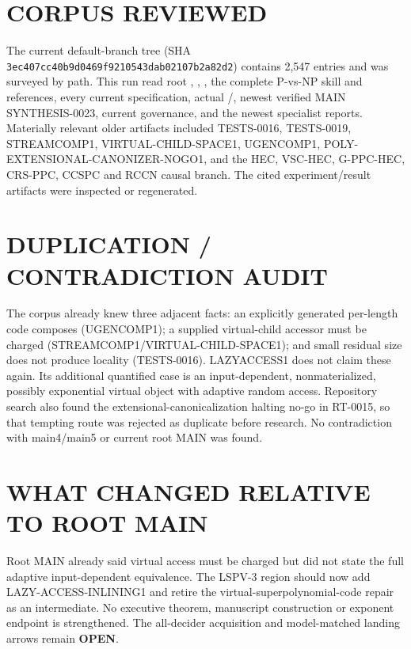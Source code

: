 \documentclass[11pt]{article}
\newcommand{\OPEN}{\textbf{OPEN}}
\begin{document}
\section{CORPUS REVIEWED}
The current default-branch tree (SHA
\texttt{3ec407cc40b9d0469f9210543dab02107b2a82d2}) contains 2,547 entries and
was surveyed by path.  This run read root , ,
, the complete P-vs-NP skill and references, every current
 specification, actual /, newest
verified MAIN SYNTHESIS-0023, current governance, and the newest specialist
reports.  Materially relevant older artifacts included TESTS-0016,
TESTS-0019, STREAMCOMP1, VIRTUAL-CHILD-SPACE1, UGENCOMP1,
POLY-EXTENSIONAL-CANONIZER-NOGO1, and the HEC, VSC-HEC, G-PPC-HEC, CRS-PPC,
CCSPC and RCCN causal branch.  The cited experiment/result artifacts were
inspected or regenerated.

\section{DUPLICATION / CONTRADICTION AUDIT}
The corpus already knew three adjacent facts: an explicitly generated
per-length code composes (UGENCOMP1); a supplied virtual-child accessor must
be charged (STREAMCOMP1/VIRTUAL-CHILD-SPACE1); and small residual size does
not produce locality (TESTS-0016).  LAZYACCESS1 does not claim these again.
Its additional quantified case is an input-dependent, nonmaterialized,
possibly exponential virtual object with adaptive random access.  Repository
search also found the extensional-canonicalization halting no-go in RT-0015,
so that tempting route was rejected as duplicate before research.  No
contradiction with main4/main5 or current root MAIN was found.

\section{WHAT CHANGED RELATIVE TO ROOT MAIN}
Root MAIN already said virtual access must be charged but did not state the
full adaptive input-dependent equivalence.  The LSPV-3 region should now add
LAZY-ACCESS-INLINING1 and retire the virtual-superpolynomial-code repair as an
intermediate.  No executive theorem, manuscript construction or exponent
endpoint is strengthened.  The all-decider acquisition and model-matched
landing arrows remain \OPEN.
\end{document}

